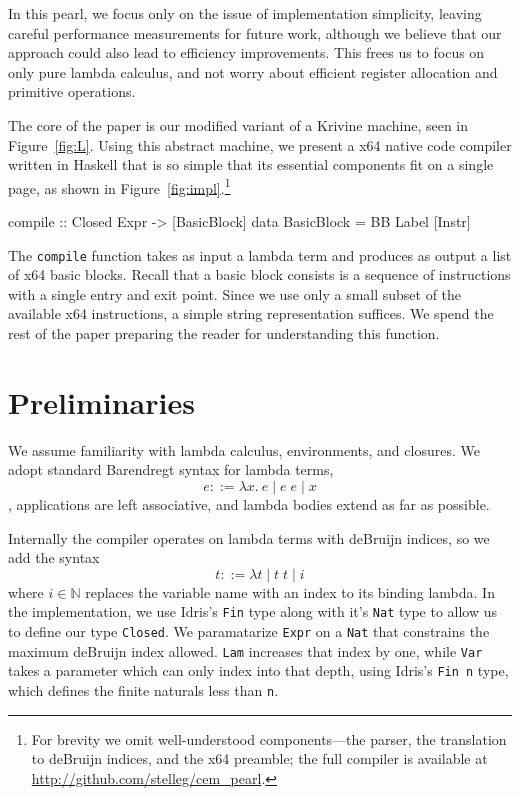 \documentclass[preprint]{sigplanconf}
\begin{document}
In this pearl, we focus only on the issue of implementation simplicity, leaving
careful performance measurements for future work, although we believe that our
approach could also lead to efficiency improvements. This frees us to focus on
only pure lambda calculus, and not worry about efficient register allocation and
primitive operations. 

The core of the paper is our modified variant of a Krivine machine, seen in
Figure~\ref{fig:L}. Using this abstract machine, we present a x64 native code
compiler written in Haskell that is so simple that its essential components fit
on a single page, as shown in Figure~\ref{fig:impl}.\footnote{For brevity we
omit well-understood components---the parser, the translation to deBruijn
indices, and the x64 preamble; the full compiler is available at
\url{http://github.com/stelleg/cem_pearl}.} 

\begin{code}
compile :: Closed Expr -> [BasicBlock]
data BasicBlock = BB Label [Instr]
\end{code}

The \texttt{compile} function takes as input a lambda term and produces as
output a list of x64 basic blocks. Recall that a basic block consists is a
sequence of instructions with a single entry and exit point. Since we use only a
small subset of the available x64 instructions, a simple string representation
suffices. We spend the rest of the paper preparing the reader for understanding
this function.

\section{Preliminaries}
We assume familiarity with lambda calculus, environments, and closures.
We adopt standard Barendregt syntax \cite{barendregt1984lambda} for lambda
terms, $$ e ::=  \lambda x.\ e \; | \; e \;  e \; | \; x $$, applications are
left associative, and lambda bodies extend as far as possible. 

Internally the compiler operates on lambda terms with deBruijn indices,
so we add the syntax $$ t ::= \lambda t \; | \; t \;
t \; | \; i $$ where $i \in \mathbb{N}$ replaces the variable name with an index
to its binding lambda. In the implementation, we use Idris's \texttt{Fin} type
along with it's \texttt{Nat} type to allow us to define our type
\texttt{Closed}. We paramatarize \texttt{Expr} on a \texttt{Nat} that constrains
the maximum deBruijn index allowed. \texttt{Lam} increases that index by one,
while \texttt{Var} takes a parameter which can only index into that depth, using
Idris's \texttt{Fin n} type, which defines the finite naturals less than
\texttt{n}. 
\end{document}
